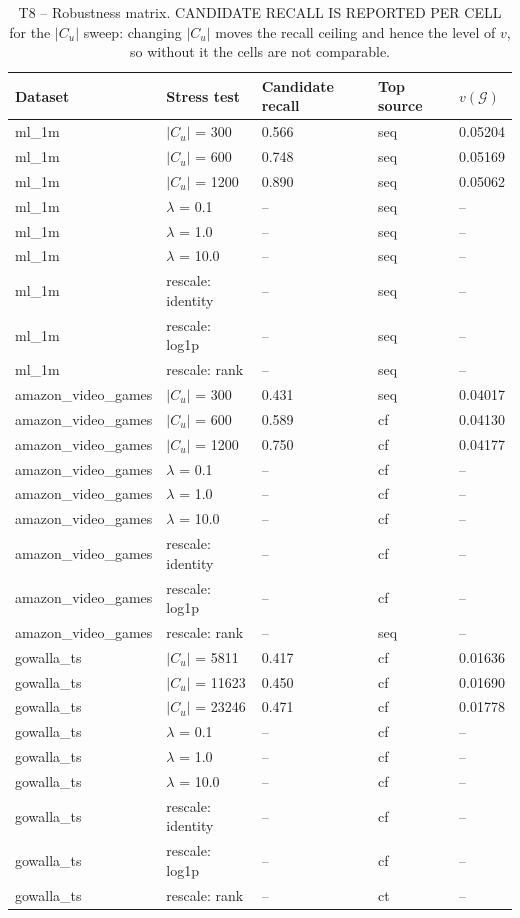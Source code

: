 \begin{table}[htbp]
\centering
\footnotesize
\caption{T8 -- Robustness matrix. CANDIDATE RECALL IS REPORTED PER CELL for the $|C_u|$ sweep: changing $|C_u|$ moves the recall ceiling and hence the level of $v$, so without it the cells are not comparable.}
\label{tab:T8_robustness}
\begin{tabular}{lllll}
\toprule
Dataset & Stress test & Candidate recall & Top source & $v(\mathcal{G})$ \\
\midrule
ml\_1m & $|C_u|$ = 300 & 0.566 & seq & 0.05204 \\
ml\_1m & $|C_u|$ = 600 & 0.748 & seq & 0.05169 \\
ml\_1m & $|C_u|$ = 1200 & 0.890 & seq & 0.05062 \\
ml\_1m & $\lambda$ = 0.1 & -- & seq & -- \\
ml\_1m & $\lambda$ = 1.0 & -- & seq & -- \\
ml\_1m & $\lambda$ = 10.0 & -- & seq & -- \\
ml\_1m & rescale: identity & -- & seq & -- \\
ml\_1m & rescale: log1p & -- & seq & -- \\
ml\_1m & rescale: rank & -- & seq & -- \\
amazon\_video\_games & $|C_u|$ = 300 & 0.431 & seq & 0.04017 \\
amazon\_video\_games & $|C_u|$ = 600 & 0.589 & cf & 0.04130 \\
amazon\_video\_games & $|C_u|$ = 1200 & 0.750 & cf & 0.04177 \\
amazon\_video\_games & $\lambda$ = 0.1 & -- & cf & -- \\
amazon\_video\_games & $\lambda$ = 1.0 & -- & cf & -- \\
amazon\_video\_games & $\lambda$ = 10.0 & -- & cf & -- \\
amazon\_video\_games & rescale: identity & -- & cf & -- \\
amazon\_video\_games & rescale: log1p & -- & cf & -- \\
amazon\_video\_games & rescale: rank & -- & seq & -- \\
gowalla\_ts & $|C_u|$ = 5811 & 0.417 & cf & 0.01636 \\
gowalla\_ts & $|C_u|$ = 11623 & 0.450 & cf & 0.01690 \\
gowalla\_ts & $|C_u|$ = 23246 & 0.471 & cf & 0.01778 \\
gowalla\_ts & $\lambda$ = 0.1 & -- & cf & -- \\
gowalla\_ts & $\lambda$ = 1.0 & -- & cf & -- \\
gowalla\_ts & $\lambda$ = 10.0 & -- & cf & -- \\
gowalla\_ts & rescale: identity & -- & cf & -- \\
gowalla\_ts & rescale: log1p & -- & cf & -- \\
gowalla\_ts & rescale: rank & -- & ct & -- \\
\bottomrule
\end{tabular}
\end{table}
